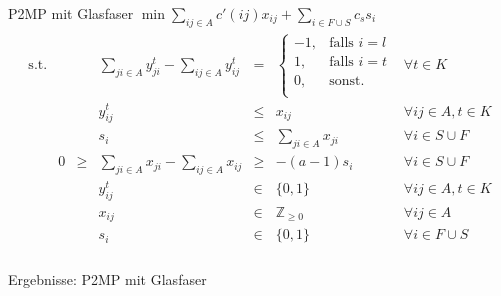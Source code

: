 \documentclass{beamer}
\newcommand{\Z}{\mathbb{Z}}
\begin{document}
	\begin{frame}{P2MP mit Glasfaser}
	 $\min \displaystyle\sum_{ij \in A} c'(ij) x_{ij} + \displaystyle\sum_{i \in F \cup S} c_s s_i $
	\begin{align*}
\begin{array}{rcrcrcl}
\textrm{s.t.}  
&& &\displaystyle\sum_{ji \in A} y_{ji}^t - \displaystyle\sum_{ij \in A} y_{ij}^t& = & \left\{\begin{array}{cl} 
-1, & \text{falls } i=l\\ 
1, & \text{falls } i=t\\ 
0, & \text{sonst.}\\ 
\end{array}
\right. & \forall t \in K\\
&&& y_{ij}^t & \leq & x_{ij} & \forall ij \in A, t\in K \\
&&& s_i &\leq& \displaystyle\sum_{ji \in A} x_{ji}& \forall  i \in S \cup F\\ 
&0&\geq&\displaystyle\sum_{ji \in A} x_{ji} - \displaystyle\sum_{ij \in A} x_{ij}&\geq& -(a-1)s_i & \forall i \in S \cup F\\
&&& y_{ij}^t & \in & \{0,1 \}& \forall ij \in A, t \in K \\
&&& x_{ij} & \in & \Z_{\geq 0} & \forall ij \in A\\
&&& s_i & \in & \{ 0,1 \} & \forall i \in F \cup S \\
\end{array}
\end{align*}
\end{frame}

\begin{frame}{Ergebnisse: P2MP mit Glasfaser}
\end{frame}
\end{document}
